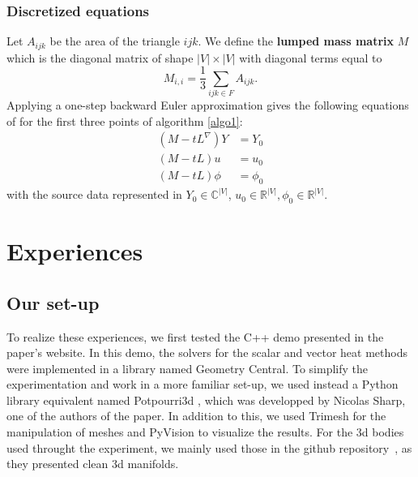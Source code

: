 \documentclass[sigconf, nonacm]{acmart}
\begin{document}
\subsubsection{Discretized equations}
Let $A_{ijk}$ be the area of the triangle $ijk$. We define the \textbf{lumped mass matrix} $M$ which is the diagonal matrix of shape $|V| \times |V|$ with diagonal terms 
equal to $$M_{i,i} = \frac{1}{3}\sum_{ijk\in F}A_{ijk}.$$ Applying a one-step backward Euler approximation gives the following equations of for the first three points 
of algorithm \ref{algo1}:
\begin{align*}
 (M-tL^\nabla)Y & = Y_0 \\
 (M - tL)u & = u_0 \\
 (M - tL)\phi & = \phi_0
\end{align*}
with the source data represented in $Y_0\in \mathbb{C}^{|V|}$, $u_0 \in \mathbb{R}^|V|, \phi_0 \in \mathbb{R}^{|V|}$.

\section{Experiences}

\subsection{Our set-up}
To realize these experiences, we first tested the C++ demo presented in the paper's website.
In this demo, the solvers for the scalar and vector heat methods were implemented in a library named Geometry Central.
To simplify the experimentation and work in a more familiar set-up, we used instead a Python library equivalent named Potpourri3d \cite{library_potpourri3d}, 
which was developped by Nicolas Sharp, one of the authors of the paper.
In addition to this, we used Trimesh for the manipulation of meshes and PyVision to visualize the results.
For the 3d bodies used throught the experiment, we mainly used those in the github repository~\cite{github_objects_repo},
as they presented clean 3d manifolds.
\end{document}
